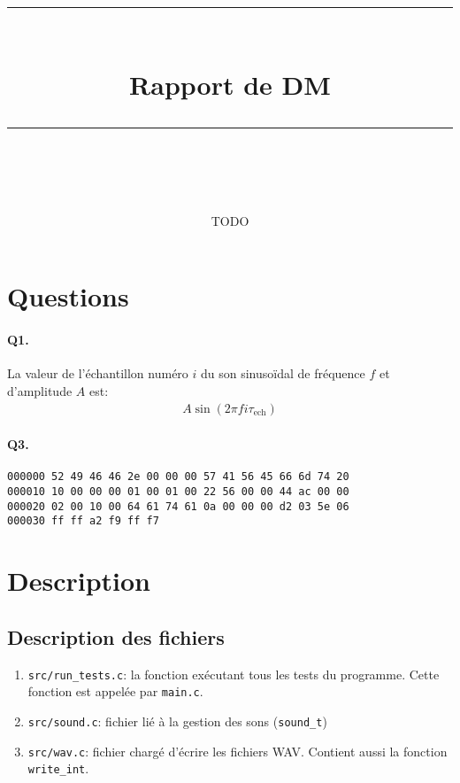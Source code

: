 \documentclass[11pt]{article} %
\title{
    \vspace{10pt} %
    \rule{\linewidth}{1pt}\\ %
    \vspace{10pt} %
    {\huge Rapport de DM}\\ %
    \rule{\linewidth}{1pt}\\ %
    \vspace{5pt} %
}
\date{\printdate{2024-12-29}}
\author{TODO}
\newcommand{\nbsp}{\nobreakspace}
\begin{document}
\maketitle{}

\section{Questions}
\paragraph{Q1.}
La valeur de l’échantillon numéro $i$ du son sinusoïdal de fréquence $f$ et
d’amplitude $A$ est\nbsp:
\begin{align*}
A \sin(2\pi f i \tau_\text{ech})
\end{align*}

\paragraph{Q3.}
\nbsp

\begin{lstlisting}
000000 52 49 46 46 2e 00 00 00 57 41 56 45 66 6d 74 20
000010 10 00 00 00 01 00 01 00 22 56 00 00 44 ac 00 00
000020 02 00 10 00 64 61 74 61 0a 00 00 00 d2 03 5e 06
000030 ff ff a2 f9 ff f7
\end{lstlisting}

\section{Description}

\subsection{Description des fichiers}
\begin{enumerate}
    \item \verb|src/run_tests.c|\nbsp: la fonction exécutant tous les tests
        du programme. Cette fonction est appelée par \verb|main.c|.
    \item \verb|src/sound.c|\nbsp: fichier lié à la gestion des sons
        (\verb|sound_t|)
    \item \verb|src/wav.c|\nbsp: fichier chargé d’écrire les fichiers WAV.
        Contient aussi la fonction \verb|write_int|.
\end{enumerate}
\end{document}
